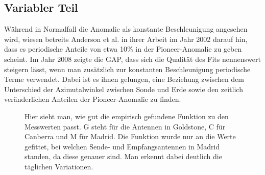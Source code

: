
\subsection{Variabler Teil}
Während in Normalfall die Anomalie als konstante Beschleunigung angesehen wird, wiesen betreits Anderson et al. in
ihrer Arbeit im Jahr 2002 darauf hin, dass es periodische Anteile von etwa 10\% in der Pioneer-Anomalie zu
geben scheint.
Im Jahr 2008 zeigte die GAP\cite{Levy2008}, dass sich die Qualität des Fits nennenswert steigern lässt, wenn man zusätzlich zur konstanten Beschleunigung periodische Terme verwendet.
Dabei ist es ihnen gelungen, eine Beziehung zwischen dem Unterschied der Azimutalwinkel zwischen Sonde und Erde sowie
den zeitlich veränderlichen Anteilen der Pioneer-Anomalie zu finden. 

\begin{figure}[htnb]
\begin{center}
\noindent    
{}
\end{center}
\vskip -10pt
  \caption{Hier sieht man, wie gut die empirisch gefundene Funktion zu den Messwerten passt. G steht für die Antennen in Goldstone, C für Canberra und M für Madrid. Die Funktion wurde nur an die Werte gefittet, bei welchen Sende- und Empfangsantennen in Madrid standen, da diese genauer sind. Man erkennt dabei deutlich die täglichen Variationen.\cite{Levy2009}}\label{fig:variabel}
\end{figure} 

